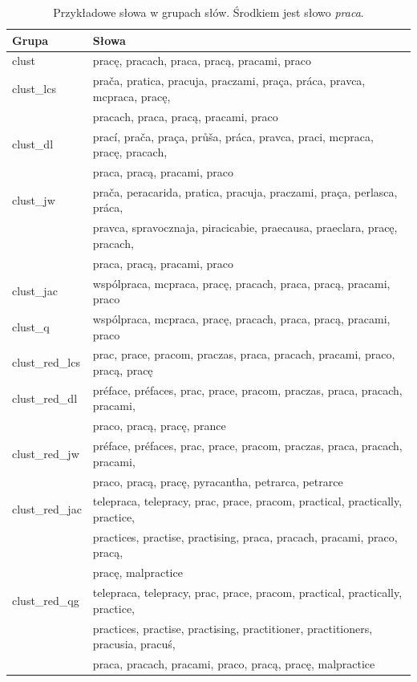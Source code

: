 \documentclass{praca1}
\begin{document}
\begin{table}[!h]
\centering
\caption{Przykładowe słowa w grupach słów. Środkiem jest słowo \emph{praca}.}
\begin{tabular}{|l|l|}
\hline
 Grupa & Słowa \\ 
  \hline \hline
clust & pracę, pracach, praca, pracą, pracami, praco \\ 
   \hline
clust\_lcs & prača, pratica, pracuja, praczami, praça, práca, pravca, mcpraca, pracę, \\ &  pracach, praca, pracą, pracami, praco \\ 
   \hline
clust\_dl & prací, prača, praça, průša, práca, pravca, praci, mcpraca, pracę, pracach, \\ &  praca, pracą, pracami, praco \\ 
   \hline
clust\_jw & prača, peracarida, pratica, pracuja, praczami, praça, perlasca, práca,  \\ & pravca, spravocznaja, piracicabie, praecausa, praeclara, pracę, pracach, \\ &  praca, pracą, pracami, praco \\ 
   \hline
clust\_jac & wspólpraca, mcpraca, pracę, pracach, praca, pracą, pracami, praco \\ 
   \hline
clust\_q & wspólpraca, mcpraca, pracę, pracach, praca, pracą, pracami, praco \\ 
   \hline
clust\_red\_lcs & prac, prace, pracom, praczas, praca, pracach, pracami, praco, pracą, pracę \\ 
   \hline
clust\_red\_dl & préface, préfaces, prac, prace, pracom, praczas, praca, pracach, pracami, \\ &  praco, pracą, pracę, prance \\ 
   \hline
clust\_red\_jw & préface, préfaces, prac, prace, pracom, praczas, praca, pracach, pracami, \\ &  praco, pracą, pracę, pyracantha, petrarca, petrarce \\ 
   \hline
clust\_red\_jac & telepraca, telepracy, prac, prace, pracom, practical, practically, practice,  \\ & practices, practise, practising, praca, pracach, pracami, praco, pracą,  \\ & pracę, malpractice \\ 
   \hline
clust\_red\_qg & telepraca, telepracy, prac, prace, pracom, practical, practically, practice, \\ &  practices, practise, practising, practitioner, practitioners, pracusia, pracuś,  \\ & praca, pracach, pracami, praco, pracą, pracę, malpractice \\ 

\end{tabular}
\end{table}
\end{document}
